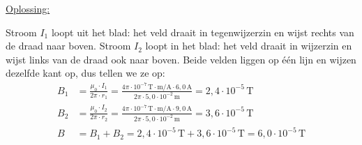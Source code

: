 \documentclass{ximera}
\begin{document}
\begin{exercise}
\begin{solution}
        \underline{Oplossing:}
        \begin{center}
        \end{center}
        Stroom $I_1$ loopt uit het blad: het veld draait in tegenwijzerzin en wijst rechts van de draad naar boven. Stroom $I_2$ loopt in het blad: het veld draait in wijzerzin en wijst links van de draad ook naar boven. Beide velden liggen op één lijn en wijzen dezelfde kant op, dus tellen we ze op:
        \begin{align*}
            B_1 &= \frac{\mu_0 \cdot I_1}{2\pi \cdot r_1} = \frac{4\pi \cdot 10^{-7}\,\mathrm{T\cdot m/A} \cdot 6{,}0\,\mathrm{A}}{2\pi \cdot 5{,}0 \cdot 10^{-2}\,\mathrm{m}} = 2{,}4 \cdot 10^{-5}\,\mathrm{T} \\
            B_2 &= \frac{\mu_0 \cdot I_2}{2\pi \cdot r_2} = \frac{4\pi \cdot 10^{-7}\,\mathrm{T\cdot m/A} \cdot 9{,}0\,\mathrm{A}}{2\pi \cdot 5{,}0 \cdot 10^{-2}\,\mathrm{m}} = 3{,}6 \cdot 10^{-5}\,\mathrm{T} \\
            B &= B_1 + B_2 = 2{,}4 \cdot 10^{-5}\,\mathrm{T} + 3{,}6 \cdot 10^{-5}\,\mathrm{T} = \boxed{6{,}0 \cdot 10^{-5}\,\mathrm{T}}
        \end{align*}
    \end{solution}
\end{exercise}
\end{document}
